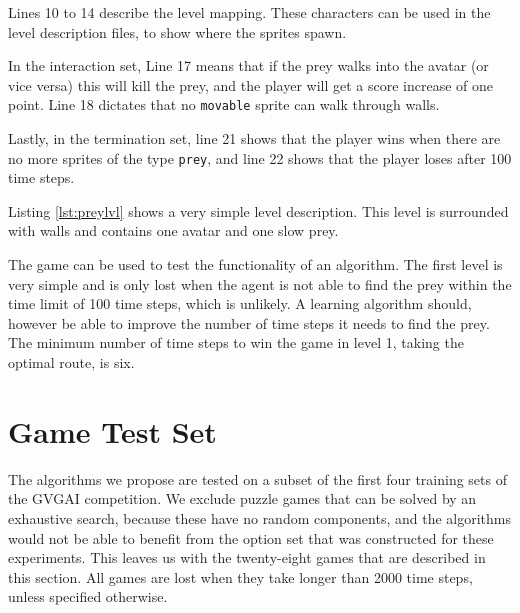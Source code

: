 Lines 10 to 14 describe the level mapping. These characters can be used in the
level description files, to show where the sprites spawn. 

In the interaction set, Line 17 means that if the prey walks into the avatar (or
vice versa) this will kill the prey, and the player will get a score increase of
one point. Line 18 dictates that no \texttt{movable} sprite can walk through
walls.

Lastly, in the termination set, line 21 shows that the player wins when there
are no more sprites of the type \texttt{prey}, and line 22 shows that the player
loses after 100 time steps.

Listing \ref{lst:preylvl} shows a very simple level description. This level is
surrounded with walls and contains one avatar and one slow prey. 

The game can be used to test the functionality of an algorithm. The first level
is very simple and is only lost when the agent is not able to find the prey
within the time limit of 100 time steps, which is unlikely. A learning
algorithm should, however be able to improve the number of time steps it needs
to find the prey. The minimum number of time steps to win the game in level 1,
taking the optimal route, is six.

\section{Game Test Set}
\label{subsec:games}
The algorithms we propose are tested on a subset of the first four training sets
of the GVGAI competition. We exclude puzzle games that can be solved by an
exhaustive search, because these have no random components, and the algorithms
would not be able to benefit from the option set that was constructed for these
experiments. This leaves us with the twenty-eight games that are described in this
section. All games are lost when they take longer than 2000 time steps, unless
specified otherwise.

